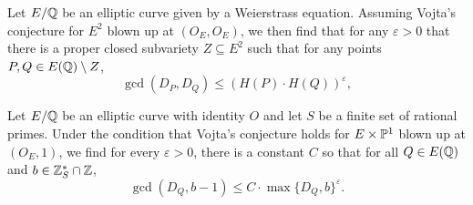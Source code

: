 \documentclass[12pt]{article}
\begin{document}
\begin{theorem}
    Let $E/ \mathbb{Q}$ be an elliptic curve given by a Weierstrass equation.
    Assuming Vojta's conjecture for $E^2$ blown up at $(O_E, O_E)$,
    we then find that for any $\varepsilon > 0$ that there is a proper closed subvariety $Z \subseteq E^2$ such that for any points $P, Q \in E(\mathbb{Q}) \setminus Z$,
    \[
        \gcd(D_P, D_Q) \leq (H(P) \cdot H(Q))^\varepsilon,
    \]
\end{theorem}

\begin{theorem}
    Let $E/\mathbb{Q}$ be an elliptic curve with identity $O$ and let $S$ be a finite set of rational primes.
    Under the condition that Vojta's conjecture holds for $E \times \mathbb{P}^1$ blown up at $(O_E, 1)$,
    we find for every $\varepsilon > 0$, there is a constant $C$ so that for all $Q \in E(\mathbb{Q})$ and $b \in \mathbb{Z}_S^* \cap \mathbb{Z}$,
    \[
        \gcd(D_Q, b - 1) \leq C \cdot \max\{D_Q, b\}^\varepsilon.
    \]
\end{theorem}
\end{document}
